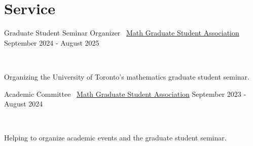 \documentclass[]{style}
\begin{document}
\section{Service}

\begin{entrylist}

\vspace{1mm}

\entry
{Graduate Student Seminar Organizer \ {\normalfont \underline{Math Graduate Student Association}}}
{September 2024 - August 2025}
{ ~ \vspace{-2.5mm}

Organizing the University of Toronto's mathematics graduate student seminar.}

\entry
{Academic Committee \ {\normalfont \underline{Math Graduate Student Association}}}
{September 2023 - August 2024}
{ ~ \vspace{-2.5mm}

Helping to organize academic events and the graduate student seminar.}

\end{entrylist}


\end{document}
